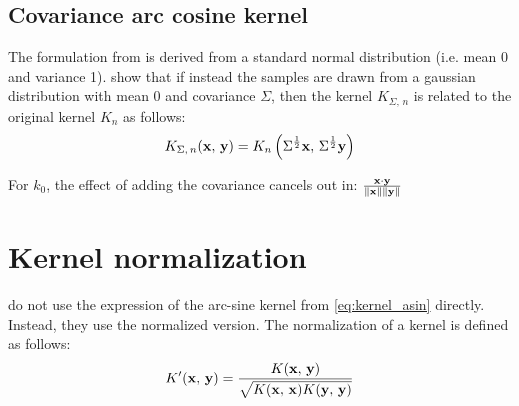 \subsection{Covariance arc cosine kernel}

The formulation from \textcite{choLargemarginClassificationInfinite2010} is
derived from a standard normal distribution (i.e. mean 0 and variance 1).
\Textcite{pandeyGoDeepWide2014} show that if instead the samples are drawn from
a gaussian distribution with mean 0 and covariance $\Sigma$, then the kernel
$K_{\Sigma,\,n}$ is related to the original kernel $K_{n}$ as follows:
\begin{equation}\label{eq:kernel_pandey}
    K_{\Sigma,\,n}(\mathbf{x},\,\mathbf{y}) = K_{n}\left(\Sigma^{\frac{1}{2}}\mathbf{x},\,\Sigma^{\frac{1}{2}}\mathbf{y}\right)
\end{equation}

\begin{cnote}
    For $k_0$, the effect of adding the covariance cancels out in:
    $\frac{\mathbf{x} \cdot \mathbf{y}}{\left\lVert \mathbf{x} \right\rVert \left\lVert \mathbf{y} \right\rVert}$
\end{cnote}

\section{Kernel normalization}%

\Textcite{frenayParameterinsensitiveKernelExtreme2011} do not use the expression
of the arc-sine kernel from \cref{eq:kernel_asin} directly. Instead, they use
the normalized version. The normalization of a kernel is defined as follows:
\begin{equation}\label{eq:kernel_normalization}
    K'(\mathbf{x},\,\mathbf{y}) = \frac{K(\mathbf{x},\,\mathbf{y})}{\sqrt{K(\mathbf{x},\,\mathbf{x})K(\mathbf{y},\,\mathbf{y})}}
\end{equation}

